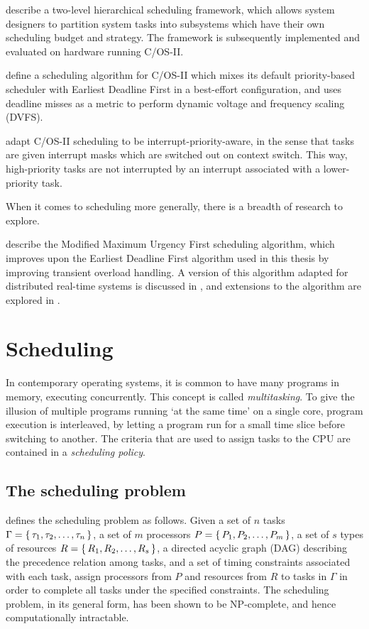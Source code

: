 \documentclass[twoside]{uva-inf-bachelor-thesis}
\newcommand{\ucosii}{\textmu C/OS-II\xspace}
\begin{document}
\textcite{tue:hfs} describe a two-level hierarchical scheduling framework, which allows system designers to partition system tasks into subsystems which have their own scheduling budget and strategy. The framework is subsequently implemented and evaluated on hardware running \ucosii. 

\textcite{Cho2011} define a scheduling algorithm for \ucosii which mixes its default priority-based scheduler with Earliest Deadline First in a best-effort configuration, and uses deadline misses as a metric to perform dynamic voltage and frequency scaling (DVFS).

\textcite{dodiu2010} adapt \ucosii scheduling to be interrupt-priority-aware, in the sense that tasks are given interrupt masks which are switched out on context switch. This way, high-priority tasks are not interrupted by an interrupt associated with a lower-priority task.

When it comes to scheduling more generally, there is a breadth of research to explore.

\textcite{salmani2005modified} describe the Modified Maximum Urgency First scheduling algorithm, which improves upon the Earliest Deadline First algorithm used in this thesis by improving transient overload handling. A version of this algorithm adapted for distributed real-time systems is discussed in \textcite{chen2006flexible}, and extensions to the algorithm are explored in \textcite{behera2012enhanced}.

%
%
%
%

\chapter{Scheduling}
In contemporary operating systems, it is common to have many programs in memory, executing concurrently. This concept is called \textit{multitasking}. To give the illusion of multiple programs running `at the same time' on a single core, program execution is interleaved, by letting a program run for a small time slice before switching to another. The criteria that are used to assign tasks to the CPU are contained in a \textit{scheduling policy}. 

\section{The scheduling problem}
\textcite{buttazzo2011hard} defines the scheduling problem as follows. Given a set of $n$ tasks $\Gamma = \set{\tau_1, \tau_2, \ldots, \tau_n}$, a set of $m$ processors $P = \set{P_1, P_2, \ldots, P_m}$, a set of $s$ types of resources $R = \set{R_1, R_2, \ldots, R_s}$, a directed acyclic graph (DAG) describing the precedence relation among tasks, and a set of timing constraints associated with each task, assign processors from $P$ and resources from $R$ to tasks in $\Gamma$ in order to complete all tasks under the specified constraints. The scheduling problem, in its general form, has been shown to be NP-complete, and hence computationally intractable.
\end{document}
